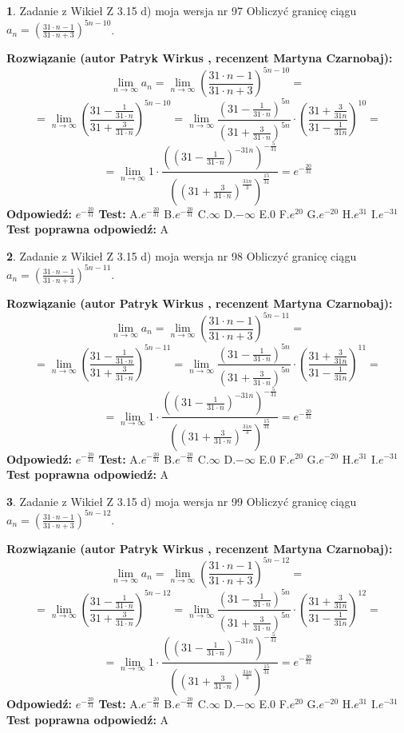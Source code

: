 \documentclass[12pt, a4paper]{article}
\theoremstyle{definition} %
\newtheorem{zad}{}
\newcommand{\zadStart}[1]{\begin{zad}#1\newline}
\newcommand{\zadStop}{\end{zad}}
\newcommand{\rozwStart}[2]{\noindent \textbf{Rozwiązanie (autor #1 , recenzent #2): }\newline}
\newcommand{\rozwStop}{\newline}
\newcommand{\odpStart}{\noindent \textbf{Odpowiedź:}\newline}
\newcommand{\odpStop}{\newline}
\newcommand{\testStart}{\noindent \textbf{Test:}\newline}
\newcommand{\testStop}{\newline}
\newcommand{\kluczStart}{\noindent \textbf{Test poprawna odpowiedź:}\newline}
\newcommand{\kluczStop}{\newline}
\begin{document}
\zadStart{Zadanie z Wikieł Z 3.15 d) moja wersja nr 97}
Obliczyć granicę ciągu $a_{n}=(\frac{31\cdot n - 1}{31 \cdot n + 3})^{5n-10}$.
\zadStop
\rozwStart{Patryk Wirkus}{Martyna Czarnobaj}
$$\lim\limits_{n\to\infty} a_{n} = \lim\limits_{n\to\infty}(\frac{31\cdot n - 1}{31 \cdot n + 3})^{5n-10}=$$
$$=\lim\limits_{n\to\infty}(\frac{31 - \frac{1}{31\cdot n}}{31 + \frac{3}{31 \cdot n}})^{5n-10}=\lim\limits_{n\to\infty}\frac{(31 - \frac{1}{31\cdot n})^{5n}}{(31 + \frac{3}{31\cdot n})^{5n}} \cdot (\frac{31+\frac{3}{31n}}{31-\frac{1}{31n}})^{10}=$$
$$=\lim\limits_{n\to\infty} 1 \cdot \frac{((31-\frac{1}{31 \cdot n})^{-31n})^{-\frac{5}{31}}}{((31+\frac{3}{31 \cdot n})^{\frac{31n}{3}})^{\frac{15}{31}}} =e^{-\frac{20}{31}}$$
\rozwStop
\odpStart
$e^{-\frac{20}{31}}$
\odpStop
\testStart
A.$ e^{-\frac{20}{31}}$
B.$ e^{-\frac{20}{31}}$
C.$\infty$
D.$-\infty$
E.$0$
F.$e^{20}$
G.$e^{-20}$
H.$e^{31}$
I.$e^{-31}$
\testStop
\kluczStart
A
\kluczStop



\zadStart{Zadanie z Wikieł Z 3.15 d) moja wersja nr 98}
Obliczyć granicę ciągu $a_{n}=(\frac{31\cdot n - 1}{31 \cdot n + 3})^{5n-11}$.
\zadStop
\rozwStart{Patryk Wirkus}{Martyna Czarnobaj}
$$\lim\limits_{n\to\infty} a_{n} = \lim\limits_{n\to\infty}(\frac{31\cdot n - 1}{31 \cdot n + 3})^{5n-11}=$$
$$=\lim\limits_{n\to\infty}(\frac{31 - \frac{1}{31\cdot n}}{31 + \frac{3}{31 \cdot n}})^{5n-11}=\lim\limits_{n\to\infty}\frac{(31 - \frac{1}{31\cdot n})^{5n}}{(31 + \frac{3}{31\cdot n})^{5n}} \cdot (\frac{31+\frac{3}{31n}}{31-\frac{1}{31n}})^{11}=$$
$$=\lim\limits_{n\to\infty} 1 \cdot \frac{((31-\frac{1}{31 \cdot n})^{-31n})^{-\frac{5}{31}}}{((31+\frac{3}{31 \cdot n})^{\frac{31n}{3}})^{\frac{15}{31}}} =e^{-\frac{20}{31}}$$
\rozwStop
\odpStart
$e^{-\frac{20}{31}}$
\odpStop
\testStart
A.$ e^{-\frac{20}{31}}$
B.$ e^{-\frac{20}{31}}$
C.$\infty$
D.$-\infty$
E.$0$
F.$e^{20}$
G.$e^{-20}$
H.$e^{31}$
I.$e^{-31}$
\testStop
\kluczStart
A
\kluczStop



\zadStart{Zadanie z Wikieł Z 3.15 d) moja wersja nr 99}
Obliczyć granicę ciągu $a_{n}=(\frac{31\cdot n - 1}{31 \cdot n + 3})^{5n-12}$.
\zadStop
\rozwStart{Patryk Wirkus}{Martyna Czarnobaj}
$$\lim\limits_{n\to\infty} a_{n} = \lim\limits_{n\to\infty}(\frac{31\cdot n - 1}{31 \cdot n + 3})^{5n-12}=$$
$$=\lim\limits_{n\to\infty}(\frac{31 - \frac{1}{31\cdot n}}{31 + \frac{3}{31 \cdot n}})^{5n-12}=\lim\limits_{n\to\infty}\frac{(31 - \frac{1}{31\cdot n})^{5n}}{(31 + \frac{3}{31\cdot n})^{5n}} \cdot (\frac{31+\frac{3}{31n}}{31-\frac{1}{31n}})^{12}=$$
$$=\lim\limits_{n\to\infty} 1 \cdot \frac{((31-\frac{1}{31 \cdot n})^{-31n})^{-\frac{5}{31}}}{((31+\frac{3}{31 \cdot n})^{\frac{31n}{3}})^{\frac{15}{31}}} =e^{-\frac{20}{31}}$$
\rozwStop
\odpStart
$e^{-\frac{20}{31}}$
\odpStop
\testStart
A.$ e^{-\frac{20}{31}}$
B.$ e^{-\frac{20}{31}}$
C.$\infty$
D.$-\infty$
E.$0$
F.$e^{20}$
G.$e^{-20}$
H.$e^{31}$
I.$e^{-31}$
\testStop
\kluczStart
A
\kluczStop
\end{document}
